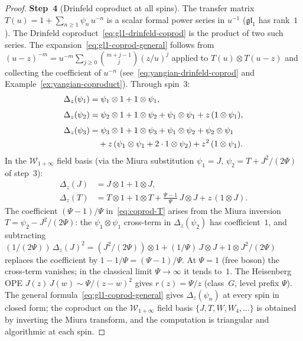 \documentclass[11pt,reqno]{amsart}
\theoremstyle{definition}
\theoremstyle{remark}
\newcommand{\cW}{\mathcal{W}}
\numberwithin{equation}{section}
\begin{document}
\begin{proof}
\medskip
\noindent
\textbf{Step~4}
(Drinfeld coproduct at all spins).
The transfer matrix
$T(u) = 1 + \sum_{n \geq 1} \psi_n\, u^{-n}$
is a scalar formal power series in $u^{-1}$
($\mathfrak{gl}_1$ has rank~$1$). The Drinfeld
coproduct~\eqref{eq:gl1-drinfeld-coprod} is the product
of two such series. The
expansion~\eqref{eq:gl1-coprod-general} follows from
$(u - z)^{-m} = u^{-m} \sum_{j \geq 0}
\binom{m+j-1}{j} (z/u)^j$ applied to
$T(u) \otimes T(u-z)$ and collecting the coefficient
of $u^{-n}$
(see~\eqref{eq:yangian-drinfeld-coprod} and
Example~\ref{ex:yangian-coproduct}).
Through spin~$3$:
\begin{align}
  \Delta_z(\psi_1)
  &= \psi_1 \otimes 1
  + 1 \otimes \psi_1,
  \label{eq:coprod-psi1} \\[4pt]
  \Delta_z(\psi_2)
  &= \psi_2 \otimes 1
  + 1 \otimes \psi_2
  + \psi_1 \otimes \psi_1
  + z\,(1 \otimes \psi_1),
  \label{eq:coprod-psi2} \\[4pt]
  \Delta_z(\psi_3)
  &= \psi_3 \otimes 1
  + 1 \otimes \psi_3
  + \psi_1 \otimes \psi_2
  + \psi_2 \otimes \psi_1
  \notag \\
  &\quad
  + z\,(\psi_1 \otimes \psi_1
  + 2 \cdot 1 \otimes \psi_2)
  + z^2\,(1 \otimes \psi_1).
  \label{eq:coprod-psi3}
\end{align}
In the $\cW_{1+\infty}$ field basis (via the Miura
substitution $\psi_1 = J$,
$\psi_2 = T + J^2/(2\Psi)$ of step~3):
\begin{align}
  \Delta_z(J)
  &= J \otimes 1
  + 1 \otimes J,
  \label{eq:coprod-J} \\[4pt]
  \Delta_z(T)
  &= T \otimes 1
  + 1 \otimes T
  + \tfrac{\Psi - 1}{\Psi}\, J \otimes J
  + z\,(1 \otimes J).
  \label{eq:coprod-T}
\end{align}
The coefficient $(\Psi - 1)/\Psi$ in~\eqref{eq:coprod-T}
arises from the Miura inversion $T = \psi_2 - J^2/(2\Psi)$:
the $\psi_1 \otimes \psi_1$ cross-term in
$\Delta_z(\psi_2)$ has coefficient~$1$, and
subtracting $(1/(2\Psi))\,\Delta_z(J)^2
= (J^2/(2\Psi)) \otimes 1 + (1/\Psi)\,J \otimes J
+ 1 \otimes J^2/(2\Psi)$
replaces the coefficient by $1 - 1/\Psi = (\Psi - 1)/\Psi$.
At $\Psi = 1$ (free boson) the cross-term vanishes;
in the classical limit $\Psi \to \infty$ it tends to~$1$.
The Heisenberg OPE
$J(z)\,J(w) \sim \Psi/(z-w)^2$ gives
$r(z) = \Psi/z$ (class~$G$, level prefix $\Psi$).
The general formula~\eqref{eq:gl1-coprod-general} gives
$\Delta_z(\psi_n)$ at every spin in closed form; the
coproduct on the $\cW_{1+\infty}$ field basis
$\{J, T, W, W_4, \ldots\}$ is obtained by inverting
the Miura transform, and the computation is triangular
and algorithmic at each spin.


\end{proof}
\end{document}
